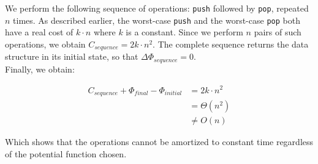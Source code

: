 We perform the following sequence of operations: \texttt{push} followed by \texttt{pop}, repeated $n$ times. As described earlier, the worst-case \texttt{push} and the worst-case \texttt{pop} both have a real cost of $k \cdot n$ where $k$ is a constant. Since we perform $n$ pairs of such operations, we obtain $C_{sequence} = 2k \cdot n^2$. The complete sequence returns the data structure in its initial state, so that $\Delta\Phi_{sequence} = 0$.\\

Finally, we obtain:

\[
\begin{array}{rl}
  C_{sequence} + \Phi_{final} - \Phi_{initial} & = 2k \cdot n^2 \\
   & = \Theta (n^2) \\
   & \neq O(n)
\end{array}
\]

Which shows that the operations cannot be amortized to constant time regardless of the potential function chosen.
